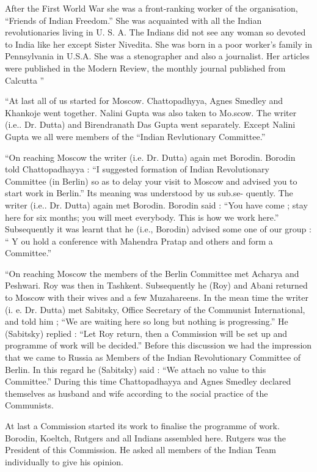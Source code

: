 After the First World War she was a front-ranking worker of the organisation, “Friends of Indian Freedom.” She was acquainted with all the Indian revolutionaries living in U. S. A. The Indians did not see any woman so devoted to India like her except Sister Nivedita. She was born in a poor worker’s family in Pennsylvania in U.S.A. She was a stenographer and also a journalist. Her articles were published in the Modern Review, the monthly journal published from Calcutta ” 

“At last all of us started for Moscow. Chattopadhyya, Agnes Smedley and Khankoje went together. Nalini Gupta was also taken to Mo.scow. The writer (i.e.. Dr. Dutta) and Birendranath Das Gupta went separately. Except Nalini Gupta we all were members of the “Indian Revlutionary 
Committee.” 

“On reaching Moscow the writer (i.e. Dr. Dutta) again met Borodin. Borodin told Chattopadhayya : “I suggested formation of Indian Revolutionary Committee (in Berlin) so as to delay your visit to Moscow and advised you to start work in Berlin.” Its meaning was understood by us sub.se- 
quently. The writer (i.e.. Dr. Dutta) again met Borodin. Borodin said : “You have come ; stay here for six months; you will meet everybody. This is how we work here.” Subsequently it was learnt that he (i.e., Borodin) advised some one of our group : “ Y ou hold a conference with Mahendra Pratap and others and form a Committee.” 

“On reaching Moscow the members of the Berlin Committee met Acharya and Peshwari. Roy was then in Tashkent. Subsequently he (Roy) and Abani returned to Moscow with their wives and a few Muzahareens. In the mean time the writer (i. e. Dr. Dutta) met Sabitsky, Office Secretary of the 
Communist International, and told him ; “We are waiting here so long but nothing is progressing.” He (Sabitsky) replied : “Let Roy return, then a Commission will be set up and programme of work will be decided.” Before this discussion we had the impression that we came to Russia as 
Members of the Indian Revolutionary Committee of Berlin. In this regard he (Sabitsky) said : “We attach no value to this Committee.” During this time Chattopadhayya and Agnes Smedley declared themselves as husband and wife according to the social practice of the Communists. 

At last a Commission started its work to finalise the programme of work. Borodin, Koeltch, Rutgers and all Indians assembled here. Rutgers was the President of this Commission. He asked all members of the Indian Team individually to give his opinion. 

